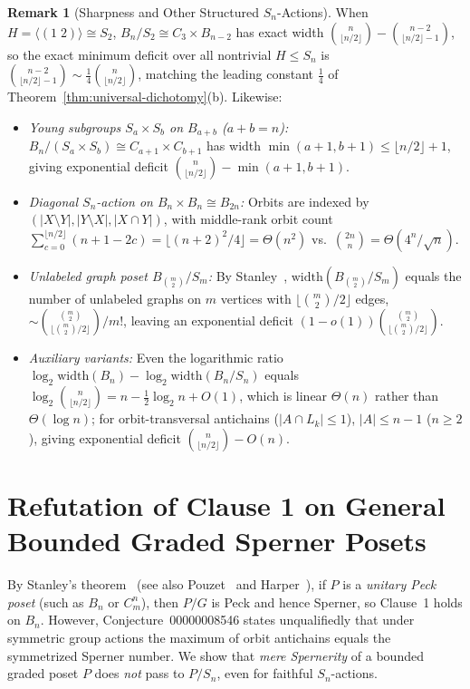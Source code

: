 \documentclass[11pt,a4paper]{article}
\theoremstyle{definition}
\newtheorem{remark}[theorem]{Remark}
\newcommand{\Bn}{B_n}
\newcommand{\Sn}{S_n}
\newcommand{\width}{\mathrm{width}}
\begin{document}
\begin{remark}[Sharpness and Other Structured $\Sn$-Actions]\label{rem:sharpness}
When $H = \langle (1\;2) \rangle \cong S_2$, $\Bn/S_2 \cong C_3 \times B_{n-2}$ has exact width $\binom{n}{\lfloor n/2 \rfloor} - \binom{n-2}{\lfloor n/2 \rfloor - 1}$, so the exact minimum deficit over all nontrivial $H \le \Sn$ is $\binom{n-2}{\lfloor n/2 \rfloor - 1} \sim \frac{1}{4}\binom{n}{\lfloor n/2 \rfloor}$, matching the leading constant $\frac{1}{4}$ of Theorem~\ref{thm:universal-dichotomy}(b). Likewise:
\begin{itemize}
  \item \emph{Young subgroups $S_a \times S_b$ on $B_{a+b}$ ($a+b=n$):} $\Bn/(S_a \times S_b) \cong C_{a+1} \times C_{b+1}$ has width $\min(a+1, b+1) \le \lfloor n/2 \rfloor + 1$, giving exponential deficit $\binom{n}{\lfloor n/2 \rfloor} - \min(a+1, b+1)$.
  \item \emph{Diagonal $\Sn$-action on $\Bn \times \Bn \cong B_{2n}$:} Orbits are indexed by $(|X \setminus Y|, |Y \setminus X|, |X \cap Y|)$, with middle-rank orbit count $\sum_{c=0}^{\lfloor n/2 \rfloor}(n + 1 - 2c) = \lfloor (n+2)^2/4 \rfloor = \Theta(n^2)$ vs.\ $\binom{2n}{n} = \Theta(4^n/\sqrt{n})$.
  \item \emph{Unlabeled graph poset $B_{\binom{m}{2}} / S_m$:} By Stanley~\cite{Stanley1984}, $\width(B_{\binom{m}{2}}/S_m)$ equals the number of unlabeled graphs on $m$ vertices with $\lfloor \binom{m}{2}/2 \rfloor$ edges, $\sim \binom{\binom{m}{2}}{\lfloor \binom{m}{2}/2 \rfloor} / m!$, leaving an exponential deficit $(1 - o(1))\binom{\binom{m}{2}}{\lfloor \binom{m}{2}/2 \rfloor}$.
  \item \emph{Auxiliary variants:} Even the logarithmic ratio $\log_2 \width(\Bn) - \log_2 \width(\Bn/\Sn)$ equals $\log_2 \binom{n}{\lfloor n/2 \rfloor} = n - \frac{1}{2}\log_2 n + O(1)$, which is linear $\Theta(n)$ rather than $\Theta(\log n)$; for orbit-transversal antichains ($|A \cap L_k| \le 1$), $|A| \le n-1$ ($n \ge 2$), giving exponential deficit $\binom{n}{\lfloor n/2 \rfloor} - O(n)$.
\end{itemize}
\end{remark}

\section{Refutation of Clause 1 on General Bounded Graded Sperner Posets}

By Stanley's theorem~\cite{Stanley1984} (see also Pouzet~\cite{Pouzet1976} and Harper~\cite{Harper1985}), if $P$ is a \emph{unitary Peck poset} (such as $\Bn$ or $C_m^n$), then $P/G$ is Peck and hence Sperner, so Clause~1 holds on $\Bn$. However, Conjecture~00000008546 states unqualifiedly that under symmetric group actions the maximum of orbit antichains equals the symmetrized Sperner number. We show that \emph{mere Spernerity} of a bounded graded poset $P$ does \emph{not} pass to $P/\Sn$, even for faithful $\Sn$-actions.
\end{document}
